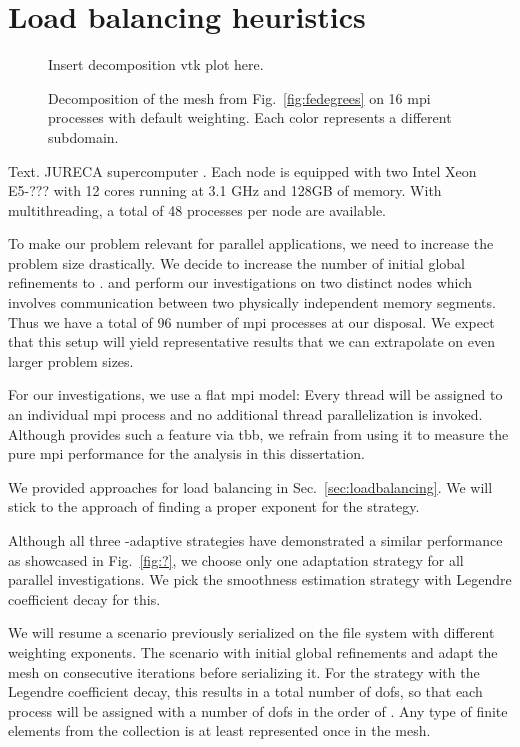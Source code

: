 \section{Load balancing heuristics}
\label{sec:heuristics}

\begin{figure}
\centering
Insert decomposition vtk plot here.
\caption{Decomposition of the mesh from Fig.~\ref{fig:fedegrees} on 16 \gls{mpi} processes with default weighting. Each color represents a different subdomain.}
\label{fig:decomposition}
\end{figure}

Text. JURECA supercomputer \parencite{krause2016}. Each node is equipped with two Intel Xeon E5-??? with 12 cores running at 3.1 GHz and 128GB of memory. With multithreading, a total of 48 processes per node are available.

To make our problem relevant for parallel applications, we need to increase the problem size drastically. We decide to increase the number of initial global refinements to . and perform our investigations on two distinct nodes which involves communication between two physically independent memory segments. Thus we have a total of 96 number of \gls{mpi} processes at our disposal. We expect that this setup will yield representative results that we can extrapolate on even larger problem sizes.

For our investigations, we use a flat \gls{mpi} model: Every thread will be assigned to an individual \gls{mpi} process and no additional thread parallelization is invoked. Although \dealii{} provides such a feature via \gls{tbb}, we refrain from using it to measure the pure \gls{mpi} performance for the analysis in this dissertation.

We provided approaches for load balancing in Sec.~\ref{sec:loadbalancing}. We will stick to the approach of finding a proper exponent for the strategy.

Although all three \hp-adaptive strategies have demonstrated a similar performance as showcased in Fig.~\ref{fig:?}, we choose only one adaptation strategy for all parallel investigations. We pick the smoothness estimation strategy with Legendre coefficient decay for this.

We will resume a scenario previously serialized on the file system with different weighting exponents. The scenario with  initial global refinements and adapt the mesh on  consecutive iterations before serializing it. For the strategy with the Legendre coefficient decay, this results in a total number of  \glspl{dof}, so that each process will be assigned with a number of \glspl{dof} in the order of . Any type of finite elements from the collection is at least represented once in the mesh.

